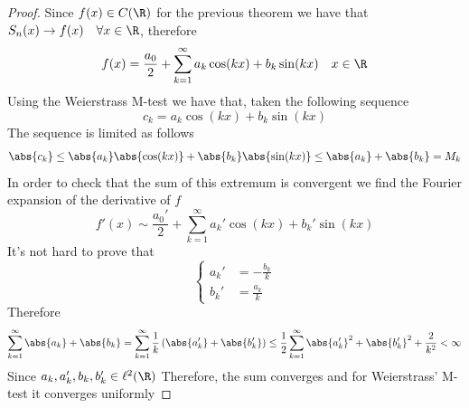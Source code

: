\documentclass[../mmf.tex]{subfiles}
\begin{document}
\begin{proof}
	Since $f(x)\in C(\R)$ for the previous theorem we have that $S_n(x)\to f(x)\quad\forall x\in\R$, therefore
	\begin{equation*}
		f(x)=\frac{a_0}{2}+\sum_{k=1}^{\infty}a_k\cos(kx)+b_k\sin(kx)\quad x\in\R
	\end{equation*}
	Using the Weierstrass M-test we have that, taken the following sequence
	\begin{equation*}
		c_k=a_k\cos(kx)+b_k\sin(kx)
	\end{equation*}
	The sequence is limited as follows
	\begin{equation*}
		\abs{c_k}\le\abs{a_k}\abs{\cos(kx)}+\abs{b_k}\abs{\sin(kx)}\le\abs{a_k}+\abs{b_k}=M_k
	\end{equation*}
	In order to check that the sum of this extremum is convergent we find the Fourier expansion of the derivative of $f$
	\begin{equation*}
		f'(x)\sim\frac{a_0'}{2}+\sum_{k=1}^{\infty}a_k'\cos(kx)+b_k'\sin(kx)
	\end{equation*}
	It's not hard to prove that
	\begin{equation*}
		\left\{ \begin{aligned}
				a_k'&=-\frac{b_k}{k}\\
				b_k'&=\frac{a_k}{k}
		\end{aligned}\right.
	\end{equation*}
	Therefore
	\begin{equation*}
		\sum_{k=1}^{\infty}\abs{a_k}+\abs{b_k}=\sum_{k=1}^{\infty}\frac{1}{k}\left( \abs{a_k'}+\abs{b_k'} \right)\le\frac{1}{2}\sum_{k=1}^{\infty}\abs{a_k'}^2+\abs{b_k'}^2+\frac{2}{k^2}<\infty
	\end{equation*}
	Since $a_k,a_k',b_k,b_k'\in\ell^2(\R)$
	Therefore, the sum converges and for Weierstrass' M-test it converges uniformly
\end{proof}
\end{document}
